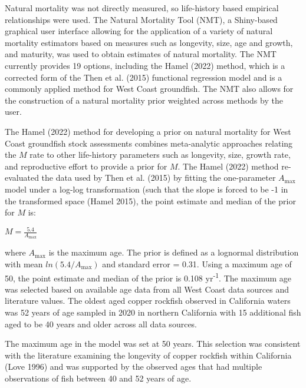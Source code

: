 \documentclass[11pt,
  english,
  letterpaper,
]{article}
\begin{document}
Natural mortality was not directly measured, so life-history based empirical relationships were used. The Natural Mortality Tool (NMT), a Shiny-based graphical user interface allowing for the application of a variety of natural mortality estimators based on measures such as longevity, size, age and growth, and maturity, was used to obtain estimates of natural mortality. The NMT currently provides 19 options, including the Hamel (2022) method, which is a corrected form of the Then et al. (2015) functional regression model and is a commonly applied method for West Coast groundfish. The NMT also allows for the construction of a natural mortality prior weighted across methods by the user.

The Hamel (2022) method for developing a prior on natural mortality for West Coast groundfish stock assessments combines meta-analytic approaches relating the \(M\) rate to other life-history parameters such as longevity, size, growth rate, and reproductive effort to provide a prior for \(M\). The Hamel (2022) method re-evaluated the data used by Then et al. (2015) by fitting the one-parameter \(A_{\text{max}}\) model under a log-log transformation (such that the slope is forced to be -1 in the transformed space (Hamel 2015), the point estimate and median of the prior for \(M\) is:

\begin{centering}

$M=\frac{5.4}{A_{\text{max}}}$

\end{centering}

\vspace{0.5cm}

where \(A_{\text{max}}\) is the maximum age. The prior is defined as a lognormal distribution with mean \(ln(5.4/A_{\text{max}})\) and standard error = 0.31. Using a maximum age of 50, the point estimate and median of the prior is 0.108 yr\textsuperscript{-1}. The maximum age was selected based on available age data from all West Coast data sources and literature values. The oldest aged copper rockfish observed in California waters was 52 years of age sampled in 2020 in northern California with 15 additional fish aged to be 40 years and older across all data sources.

The maximum age in the model was set at 50 years. This selection was consistent with the literature examining the longevity of copper rockfish within California (Love 1996) and was supported by the observed ages that had multiple observations of fish between 40 and 52 years of age.
\end{document}
